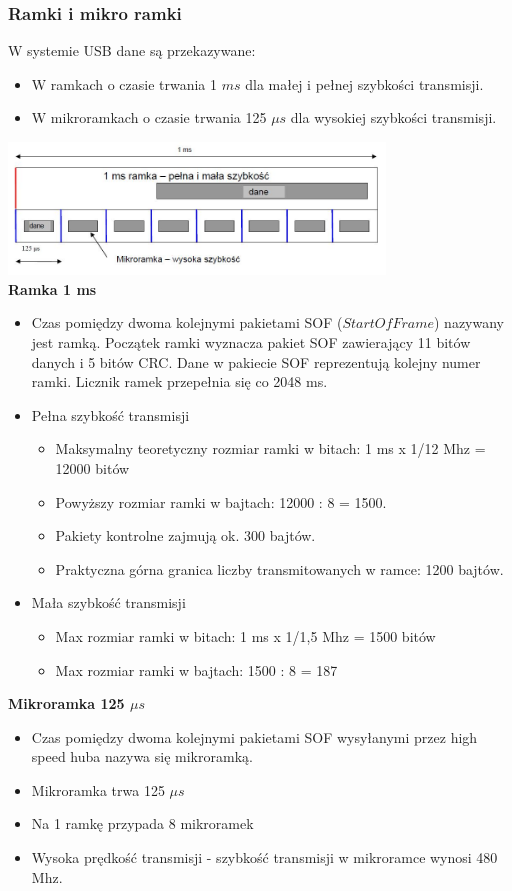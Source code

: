 		\subsubsection{Ramki i mikro ramki}
			W systemie USB dane są przekazywane:
			\begin{itemize}
				\item W ramkach o czasie trwania 1 $ms$ dla małej i pełnej szybkości transmisji.
				\item W mikroramkach o czasie trwania 125 $\mu s$ dla wysokiej szybkości transmisji.
			\end{itemize}
			\includegraphics[width=10cm]{./wyklady/USB_11_1.jpg}\\
			\textbf{Ramka 1 ms}
			\begin{itemize}
				\item Czas pomiędzy dwoma kolejnymi pakietami SOF ($Start Of Frame$) nazywany jest ramką. Początek ramki wyznacza pakiet SOF zawierający 11 bitów danych i 5 bitów CRC. Dane w pakiecie SOF reprezentują kolejny numer ramki. Licznik ramek przepełnia się co 2048 ms.
				\item Pełna szybkość transmisji
				\begin{itemize}
					\item Maksymalny teoretyczny rozmiar ramki w bitach: 1 ms x 1/12 Mhz = 12000 bitów
					\item Powyższy rozmiar ramki w bajtach: 12000 : 8 = 1500.
					\item Pakiety kontrolne zajmują ok. 300 bajtów.
					\item Praktyczna górna granica liczby transmitowanych w ramce: 1200 bajtów.
				\end{itemize}
				\item Mała szybkość transmisji
				\begin{itemize}
					\item Max rozmiar ramki w bitach: 1 ms x 1/1,5 Mhz = 1500 bitów
					\item Max rozmiar ramki w bajtach: 1500 : 8 = 187
				\end{itemize}
			\end{itemize}
			\textbf{Mikroramka 125 $\mu s$}
			\begin{itemize}
				\item Czas pomiędzy dwoma kolejnymi pakietami SOF wysyłanymi przez high speed huba nazywa się mikroramką.
				\item Mikroramka trwa 125 $\mu s$
				\item Na 1 ramkę przypada 8 mikroramek
				\item Wysoka prędkość transmisji - szybkość transmisji w mikroramce wynosi 480 Mhz.
			\end{itemize}
			
